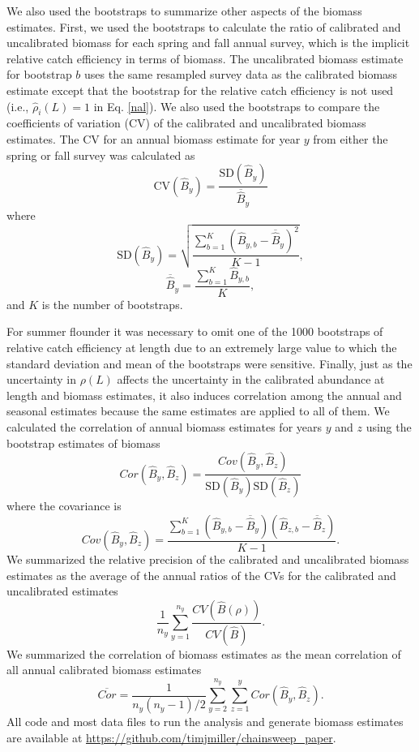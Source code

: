 \documentclass[
  12pt,
]{article}
\begin{document}
We also used the bootstraps to summarize other aspects of the biomass
estimates. First, we used the bootstraps to calculate the ratio of
calibrated and uncalibrated biomass for each spring and fall annual
survey, which is the implicit relative catch efficiency in terms of
biomass. The uncalibrated biomass estimate for bootstrap \(b\) uses the
same resampled survey data as the calibrated biomass estimate except
that the bootstrap for the relative catch efficiency is not used (i.e.,
\(\widehat \rho_i\left(L\right) = 1\) in Eq. \ref{nal}). We also used
the bootstraps to compare the coefficients of variation (CV) of the
calibrated and uncalibrated biomass estimates. The CV for an annual
biomass estimate for year \(y\) from either the spring or fall survey
was calculated as \[
\text{CV}\left(\widehat B_y\right) = \frac{\text{SD}\left(\widehat B_y\right)}{\overline{\widehat B}_y}
\] where \[
\text{SD}\left(\widehat B_y\right) = \sqrt{\frac{\sum_{b=1}^K \left(\widehat B_{y,b} - \overline{\widehat B}_y\right)^2}{K-1}},
\] \[
\overline{\widehat B}_y = \frac{\sum_{b=1}^K \widehat B_{y,b}}{K},
\] and \(K\) is the number of bootstraps.

For summer flounder it was necessary to omit one of the 1000 bootstraps
of relative catch efficiency at length due to an extremely large value
to which the standard deviation and mean of the bootstraps were
sensitive. Finally, just as the uncertainty in \(\rho\left(L\right)\)
affects the uncertainty in the calibrated abundance at length and
biomass estimates, it also induces correlation among the annual and
seasonal estimates because the same estimates are applied to all of
them. We calculated the correlation of annual biomass estimates for
years \(y\) and \(z\) using the bootstrap estimates of biomass \[
Cor\left(\widehat B_y, \widehat B_z\right) = \frac{Cov\left(\widehat B_y, \widehat B_z\right)}{\text{SD}\left(\widehat B_y\right)\text{SD}\left(\widehat B_z\right)}
\] where the covariance is \[
Cov\left(\widehat B_y, \widehat B_z\right) = \frac{\sum_{b=1}^K \left(\widehat B_{y,b} - \overline{\widehat B}_y\right)\left(\widehat B_{z,b} - \overline{\widehat B}_z\right)}{K-1}.
\] We summarized the relative precision of the calibrated and
uncalibrated biomass estimates as the average of the annual ratios of
the CVs for the calibrated and uncalibrated estimates \[
\frac{1}{n_y} \sum^{n_y}_{y = 1}\frac{CV\left(\widehat B\left(\rho\right)\right)}{CV\left(\widehat B\right)}.
\] We summarized the correlation of biomass estimates as the mean
correlation of all annual calibrated biomass estimates \[
\overline {Cor} = \frac{1}{n_y(n_y-1)/2} \sum_{y=2}^{n_y} \sum_{z=1}^{y} Cor\left(\widehat B_y, \widehat B_z\right).
\] All code and most data files to run the analysis and generate biomass
estimates are available at
\url{https://github.com/timjmiller/chainsweep_paper}.
\end{document}
